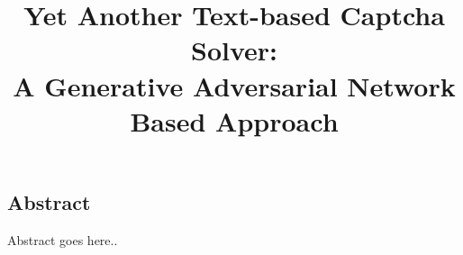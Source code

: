 \documentclass[letterpaper,twocolumn,10pt]{article}
\begin{document}

\title{Yet Another Text-based Captcha Solver: \\A Generative Adversarial Network Based Approach}
\author{
}


\maketitle

\subsection*{Abstract}
Abstract goes here..








%






%
%


{\footnotesize


}
\end{document}
